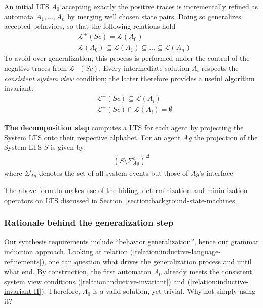 An initial LTS $A_0$ accepting exactly the positive traces is incrementally refined as automata $A_1,\ldots,A_n$ by merging well chosen state pairs. Doing so generalizes accepted behaviors, so that the following relations hold
\begin{align}
&\mathcal{L}^+(Sc) = \mathcal{L}(A_0) \\
&\mathcal{L}(A_0) \subseteq \mathcal{L}(A_1) \subseteq \ldots \subseteq \mathcal{L}(A_n)
\label{relation:inductive-language-refinements}
\end{align}
To avoid over-generalization, this process is performed under the control of the negative traces from $\mathcal{L}^-(Sc)$. Every intermediate solution $A_i$ respects the \emph{consistent system view} condition; the latter therefore provides a useful algorithm invariant:
\begin{align}
&\mathcal{L}^+(Sc) \subseteq \mathcal{L}(A_i)        \label{relation:inductive-invariant}\\
&\mathcal{L}^-(Sc) \cap \mathcal{L}(A_i) = \emptyset \label{relation:inductive-invariant-II}
\end{align}

\noindent \textbf{The decomposition step} computes a LTS for each agent by projecting the System LTS onto their respective alphabet. For an agent $Ag$ the projection of the System LTS $S$ is given by:
\begin{align}
(S \setminus \Sigma_{Ag}^c)^\Delta
\end{align}
\noindent where $\Sigma_{Ag}^c$ denotes the set of all system events but those of $Ag$'s interface.

The above formula makes use of the hiding, determinization and minimization operators on LTS discussed in Section~\ref{section:background-state-machines}.

\subsubsection*{Rationale behind the generalization step}

Our synthesis requirements include ``behavior generalization'', hence our grammar induction approach. Looking at relation (\ref{relation:inductive-language-refinements}), one can question what drives the generalization process and until what end. By construction, the first automaton $A_0$ already meets the consistent system view conditions (\ref{relation:inductive-invariant}) and (\ref{relation:inductive-invariant-II}). Therefore, $A_0$ is a valid solution, yet trivial. Why not simply using it?

